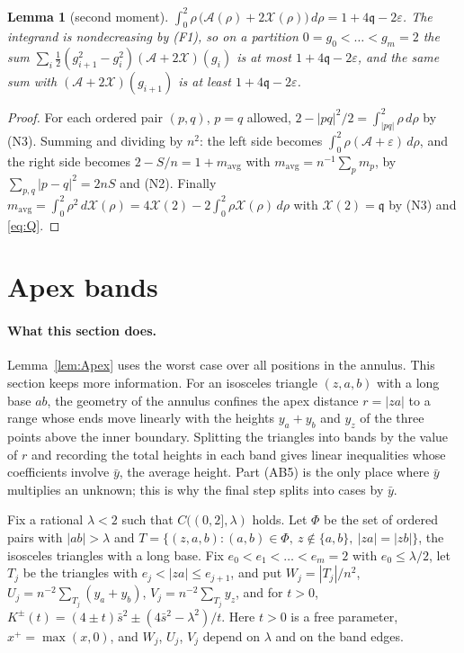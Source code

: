 \documentclass[11pt]{article}
\newcommand{\eps}{\varepsilon}
\newcommand{\cA}{\mathcal{A}}
\newcommand{\cX}{\mathcal{X}}
\newcommand{\qq}{\mathfrak{q}}
\newcommand{\sbar}{\bar{s}}
\newcommand{\ybar}{\bar{y}}
\newcommand{\mavg}{m_{\mathrm{avg}}}
\newtheorem{lemma}[theorem]{Lemma}
\theoremstyle{remark}
\begin{document}
\begin{lemma}[second moment]\label{lem:M}
$\int_0^2 \rho\,\bigl(\cA(\rho) + 2\cX(\rho)\bigr)\,d\rho = 1 + 4\qq - 2\eps$.
The integrand is nondecreasing by (F1), so on a partition
$0 = g_0 < \dots < g_m = 2$ the sum
$\sum_i \frac12(g_{i+1}^2 - g_i^2)(\cA + 2\cX)(g_i)$ is at most
$1 + 4\qq - 2\eps$, and the same sum with $(\cA + 2\cX)(g_{i+1})$ is at
least $1 + 4\qq - 2\eps$.
\end{lemma}

\begin{proof}
For each ordered pair $(p,q)$, $p = q$ allowed,
$2 - |pq|^2/2 = \int_{|pq|}^2 \rho\,d\rho$ by (N3). Summing and dividing by
$n^2$: the left side becomes $\int_0^2 \rho(\cA + \eps)\,d\rho$, and the
right side becomes $2 - S/n = 1 + \mavg$ with $\mavg = n^{-1}\sum_p m_p$,
by $\sum_{p,q}|p-q|^2 = 2nS$ and (N2). Finally
$\mavg = \int_0^2 \rho^2\,d\cX(\rho) = 4\cX(2) - 2\int_0^2\rho\cX(\rho)\,d\rho$
with $\cX(2) = \qq$ by (N3) and \eqref{eq:Q}.
\end{proof}

\section{Apex bands}\label{sec:AB}

\paragraph{What this section does.} Lemma~\ref{lem:Apex} uses the worst
case over all positions in the annulus. This section keeps more
information. For an isosceles triangle $(z,a,b)$ with a long base $ab$,
the geometry of the annulus confines the apex distance $r = |za|$ to a range whose ends move linearly with the heights $y_a + y_b$ and $y_z$ of the three points above the inner boundary. Splitting the
triangles into bands by the value of $r$ and recording the total heights
in each band gives linear inequalities whose coefficients involve
$\ybar$, the average height. Part (AB5) is the only place where $\ybar$
multiplies an unknown; this is why the final step splits into cases by
$\ybar$.

Fix a rational $\lambda < 2$ such that $C((0,2],\lambda)$ holds. Let $\Phi$
be the set of ordered pairs with $|ab| > \lambda$ and
$T = \{(z,a,b) : (a,b) \in \Phi,\ z \notin\{a,b\},\ |za| = |zb|\}$, the
isosceles triangles with a long base. Fix
$e_0 < e_1 < \dots < e_m = 2$ with $e_0 \le \lambda/2$, let $T_j$ be the
triangles with $e_j < |za| \le e_{j+1}$, and put $W_j = |T_j|/n^2$,
$U_j = n^{-2}\sum_{T_j}(y_a + y_b)$, $V_j = n^{-2}\sum_{T_j} y_z$, and for
$t > 0$, $K^\pm(t) = (4 \pm t)\sbar^2 \pm (4\sbar^2 - \lambda^2)/t$. Here $t > 0$ is a free parameter, $x^+ = \max(x, 0)$, and $W_j$, $U_j$, $V_j$ depend on $\lambda$ and on the band edges.
\end{document}
